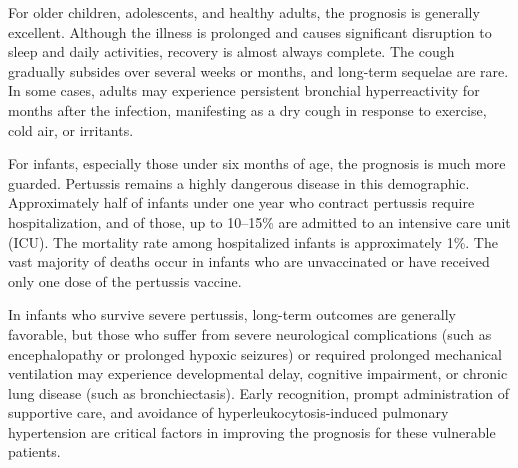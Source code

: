 For older children, adolescents, and healthy adults, the prognosis is generally excellent. Although the illness is prolonged and causes significant disruption to sleep and daily activities, recovery is almost always complete. The cough gradually subsides over several weeks or months, and long-term sequelae are rare. In some cases, adults may experience persistent bronchial hyperreactivity for months after the infection, manifesting as a dry cough in response to exercise, cold air, or irritants.

For infants, especially those under six months of age, the prognosis is much more guarded. Pertussis remains a highly dangerous disease in this demographic. Approximately half of infants under one year who contract pertussis require hospitalization, and of those, up to 10--15\% are admitted to an intensive care unit (ICU). The mortality rate among hospitalized infants is approximately 1\%. The vast majority of deaths occur in infants who are unvaccinated or have received only one dose of the pertussis vaccine.

In infants who survive severe pertussis, long-term outcomes are generally favorable, but those who suffer from severe neurological complications (such as encephalopathy or prolonged hypoxic seizures) or required prolonged mechanical ventilation may experience developmental delay, cognitive impairment, or chronic lung disease (such as bronchiectasis). Early recognition, prompt administration of supportive care, and avoidance of hyperleukocytosis-induced pulmonary hypertension are critical factors in improving the prognosis for these vulnerable patients.

